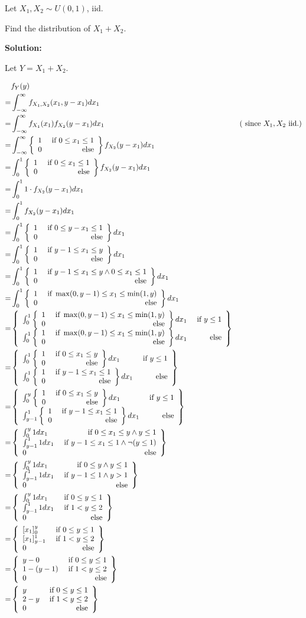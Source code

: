 \documentclass{article}
\begin{document}
Let \(X_1,X_2 \sim U(0,1)\), iid.

Find the distribution of \(X_1+X_2\).

\textbf{Solution:}

Let \(Y=X_1+X_2\).

\begin{align*}
	 & f_Y(y) \\
	=& \int_{-\infty}^\infty f_{X_1,X_2}(x_1,y-x_1)dx_1 \\
	=& \int_{-\infty}^\infty f_{X_1}(x_1)f_{X_2}(y-x_1)dx_1 & (\text{ since } X_1,X_2\text{ iid.}) \\
	=& \int_{-\infty}^\infty \casesii{1}{0\leq x_1 \leq 1}{0}f_{X_2}(y-x_1)dx_1 \\
	=& \int_0^1 \casesii{1}{0\leq x_1 \leq 1}{0}f_{X_2}(y-x_1)dx_1 \\
	=& \int_0^1 1\cdot f_{X_2}(y-x_1)dx_1 \\
	=& \int_0^1 f_{X_2}(y-x_1)dx_1 \\
	=& \int_0^1 \casesii{1}{0\leq y-x_1\leq 1}{0}dx_1 \\
	=& \int_0^1 \casesii{1}{y-1\leq x_1\leq y}{0}dx_1 \\
	=& \int_0^1 \casesii{1}{y-1\leq x_1\leq y\wedge 0\leq x_1 \leq 1}{0}dx_1 \\
	=& \int_0^1 \casesii{1}{\max(0,y-1)\leq x_1\leq \min(1,y)}{0}dx_1 \\
	=& \casesii{\int_0^1 \casesii{1}{\max(0,y-1)\leq x_1\leq \min(1,y)}{0}dx_1}{y \leq 1}{\int_0^1 \casesii{1}{\max(0,y-1)\leq x_1\leq \min(1,y)}{0}dx_1} \\
	=& \casesii{\int_0^1 \casesii{1}{0\leq x_1\leq y}{0}dx_1}{y \leq 1}{\int_0^1 \casesii{1}{y-1\leq x_1\leq 1}{0}dx_1} \\
	=& \casesii{\int_0^y \casesii{1}{0\leq x_1\leq y}{0}dx_1}{y \leq 1}{\int_{y-1}^1 \casesii{1}{y-1\leq x_1\leq 1}{0}dx_1} \\
	=& \casesiii{\int_0^y 1dx_1}{0\leq x_1 \leq y \wedge y\leq 1}{\int_{y-1}^1 1dx_1}{y-1\leq x_1 \leq 1 \wedge \neg(y\leq 1)}{0} \\
	=& \casesiii{\int_0^y 1dx_1}{0\leq y \wedge y\leq 1}{\int_{y-1}^1 1dx_1}{y-1\leq 1 \wedge y>1}{0} \\
	=& \casesiii{\int_0^y 1dx_1}{0\leq y\leq 1}{\int_{y-1}^1 1dx_1}{1<y\leq 2}{0} \\
	=& \casesiii{\hakparen{x_1}_0^y}{0\leq y\leq 1}{\hakparen{x_1}_{y-1}^1}{1<y\leq 2}{0} \\
	=& \casesiii{y-0}{0\leq y\leq 1}{1-(y-1)}{1<y\leq 2}{0} \\
	=& \casesiii{y}{0\leq y\leq 1}{2-y}{1<y\leq 2}{0} \\
\end{align*}
\end{document}
